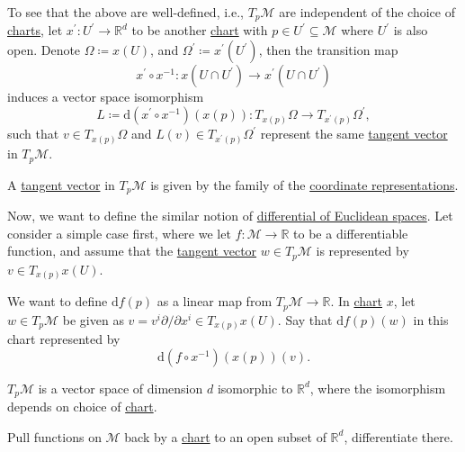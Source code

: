 To see that the above are well-defined, i.e., \(T_p \mathcal{M} \) are independent of the choice of \hyperref[def:coordinate-chart]{charts}, let \(x^\prime \colon U^\prime \to \mathbb{R} ^d\) to be another \hyperref[def:coordinate-chart]{chart} with \(p\in U^\prime \subseteq \mathcal{M} \) where \(U^\prime \) is also open. Denote \(\Omega \coloneqq x(U)\), and \(\Omega ^\prime \coloneqq x^\prime (U^\prime )\), then the transition map
\[
	x^\prime \circ x^{-1} \colon x(U \cap U^\prime )\to x^\prime (U \cap U^\prime )
\]
induces a vector space isomorphism
\[
	L\coloneqq \mathrm{d} (x^\prime \circ x ^{-1} )(x(p)) \colon T_{x(p)}\Omega \to  T_{x^\prime (p)}\Omega ^\prime,
\]
such that \(v\in T_{x(p)}\Omega \) and \(L(v)\in T_{x^\prime (p)}\Omega ^\prime \) represent the same \hyperref[def:tangent-vector]{tangent vector} in \(T_p \mathcal{M} \).

\begin{remark}
	A \hyperref[def:tangent-vector]{tangent vector} in \(T_p \mathcal{M} \) is given by the family of the \hyperref[def:coordinate-chart]{coordinate representations}.
\end{remark}

Now, we want to define the similar notion of \hyperref[def:differential-of-Euclidean-space]{differential of Euclidean spaces}. Let consider a simple case first, where we let \(f\colon \mathcal{M} \to  \mathbb{R} \) to be a differentiable function, and assume that the \hyperref[def:tangent-vector]{tangent vector} \(w\in T_p \mathcal{M} \) is represented by \(v\in T_{x(p)}x(U)\).

\begin{intuition}
	We want to define \(\mathrm{d} f(p)\) as a linear map from \(T_p \mathcal{M} \to \mathbb{R} \). In \hyperref[def:coordinate-chart]{chart} \(x\), let \(w\in T_p \mathcal{M} \) be given as \(v = v^i \partial /\partial x^i\in T_{x(p)}x(U)\). Say that \(\mathrm{d} f(p)(w)\) in this chart represented by
	\[
		\mathrm{d} (f \circ x ^{-1} )(x(p)) (v).
	\]
	\begin{center}
	\end{center}
\end{intuition}

\begin{remark}
	\(T_p \mathcal{M} \) is a vector space of dimension \(d\) isomorphic to \(\mathbb{R} ^d\), where the isomorphism depends on choice of \hyperref[def:coordinate-chart]{chart}.
\end{remark}

\begin{intuition}
	Pull functions on \(\mathcal{M} \) back by a \hyperref[def:coordinate-chart]{chart} to an open subset of \(\mathbb{R} ^d\), differentiate there.
\end{intuition}

